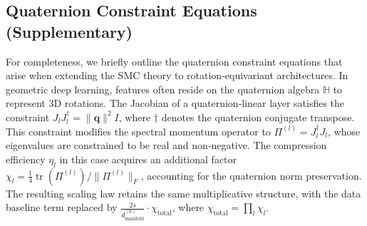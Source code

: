\documentclass[11pt, a4paper]{article}
\theoremstyle{definition}
\begin{document}
\subsection{Quaternion Constraint Equations (Supplementary)}
\label{app:quaternion-constraints}
For completeness, we briefly outline the quaternion constraint equations that arise when extending the SMC theory to rotation‑equivariant architectures. In geometric deep learning, features often reside on the quaternion algebra $\mathbb{H}$ to represent 3D rotations. The Jacobian of a quaternion‑linear layer satisfies the constraint $J_l J_l^\dagger = \|\mathbf{q}\|^2 I$, where $\dagger$ denotes the quaternion conjugate transpose. This constraint modifies the spectral momentum operator to $\Pi^{(l)} = J_l^\dagger J_l$, whose eigenvalues are constrained to be real and non‑negative. The compression efficiency $\eta_l$ in this case acquires an additional factor $\chi_l = \frac{1}{4}\operatorname{tr}(\Pi^{(l)}) / \|\Pi^{(l)}\|_F$, accounting for the quaternion norm preservation. The resulting scaling law retains the same multiplicative structure, with the data baseline term replaced by $\frac{2s}{d_{\text{manifold}}^{(0)}} \cdot \chi_{\text{total}}$, where $\chi_{\text{total}} = \prod_l \chi_l$.
\end{document}
